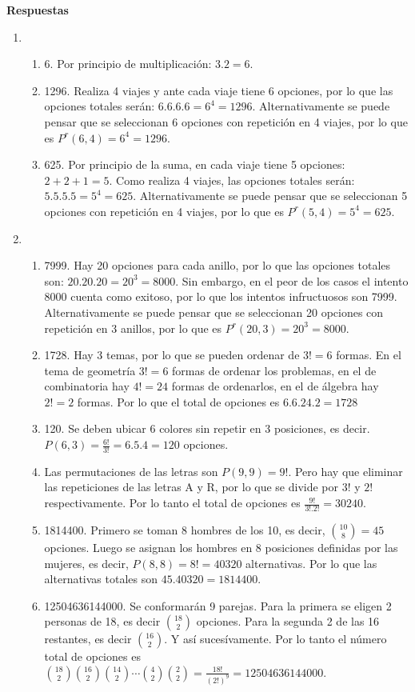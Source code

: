 \documentclass[a4paper]{article}
\newcommand{\exercise}{\item}
\begin{document}
\vspace{20pt} 
 \textbf{Respuestas}\begin{enumerate}\exercise\begin{enumerate} [label=(\alph*)]		\item 6. Por principio de multiplicación: $3 . 2 = 6$. 
		\item 1296. Realiza 4 viajes y ante cada viaje tiene 6 opciones, por lo que las opciones totales serán: $6.6.6.6 = 6^4 = 1296$. Alternativamente se puede pensar que se seleccionan 6 opciones con repetición en 4 viajes, por lo que es $P^r(6,4)=6^4=1296$.
		\item 625. Por principio de la suma, en cada viaje tiene 5 opciones: $ 2 + 2 + 1 = 5$. Como realiza 4 viajes, las opciones totales serán: $5.5.5.5 = 5^4 = 625$.  Alternativamente se puede pensar que se seleccionan 5 opciones con repetición en 4 viajes, por lo que es $P^r(5,4)=5^4=625$.
\end{enumerate}\exercise\begin{enumerate} [label=(\alph*)]		\item 7999. Hay 20 opciones para cada anillo, por lo que las opciones totales son: $20.20.20 = 20^3 = 8000$. Sin embargo, en el peor de los casos el intento 8000 cuenta como exitoso, por lo que los intentos infructuosos son 7999. Alternativamente se puede pensar que se seleccionan 20 opciones con repetición en 3 anillos, por lo que es $P^r(20,3)=20^3=8000$. 
		\item 1728. Hay 3 temas, por lo que se pueden ordenar de $3! = 6$ formas. En el tema de geometría $3! = 6$ formas de ordenar los problemas, en el de combinatoria hay $4!=24$ formas de ordenarlos, en el de álgebra hay $2!=2$ formas. Por lo que el total de opciones es $6.6.24.2 = 1728$
		\item 120. Se deben ubicar 6 colores sin repetir en 3 posiciones, es decir. $P(6,3)=\frac{6!}{3!}=6.5.4=120$ opciones.
		\item Las permutaciones de las letras son $P(9,9)=9!$. Pero hay que eliminar las repeticiones de las letras A y R, por lo que se divide por $3!$ y $2!$ respectivamente. Por lo tanto el total de opciones es $\frac{9!}{3!.2!}=30240$.
		\item 1814400. Primero se toman 8 hombres de los 10, es decir, $\binom{10}{8}=45$ opciones. Luego se asignan los hombres en 8 posiciones definidas por las mujeres, es decir, $P(8,8)=8!=40320$ alternativas. Por lo que las alternativas totales son $45.40320=1814400$.
		\item 12504636144000. Se conformarán 9 parejas. Para la primera se eligen 2 personas de 18, es decir $\binom{18}{2}$ opciones. Para la segunda 2 de las 16 restantes, es decir $\binom{16}{2}$. Y así sucesívamente. Por lo tanto el número total de opciones es $\binom{18}{2}\binom{16}{2}\binom{14}{2} \cdots \binom{4}{2}\binom{2}{2}=\frac{18!}{(2!)^9}=12504636144000$.

\end{enumerate}
\end{enumerate}
\end{document}
